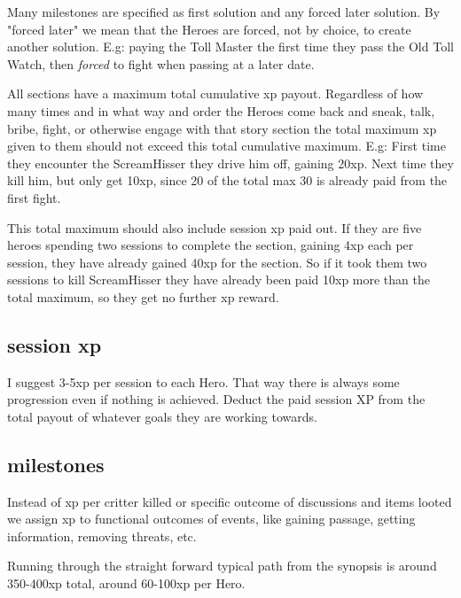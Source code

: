 Many milestones are specified as first solution and any forced later solution. By "forced later" we mean that the Heroes are forced, not by choice, to create another solution. E.g: paying the Toll Master the first time they pass the Old Toll Watch, then \emph{forced} to fight when passing at a later date.

All sections have a maximum total cumulative xp payout. Regardless of how many times and in what way and order the Heroes come back and sneak, talk, bribe, fight, or otherwise engage with that story section the total maximum xp given to them should not exceed this total cumulative maximum. E.g: First time they encounter the ScreamHisser they drive him off, gaining 20xp. Next time they kill him, but only get 10xp, since 20 of the total max 30 is already paid from the first fight.

This total maximum should also include session xp paid out. If they are five heroes spending two sessions to complete the section, gaining 4xp each per session, they have already gained 40xp for the section. So if it took them two sessions to kill ScreamHisser they have already been paid 10xp more than the total maximum, so they get no further xp reward.


\subsection*{session xp}
I suggest 3-5xp per session to each Hero. That way there is always some progression even if nothing is achieved. Deduct the paid session XP from the total payout of whatever goals they are working towards.


\subsection*{milestones}
Instead of xp per critter killed or specific outcome of discussions and items looted we assign xp to functional outcomes of events, like gaining passage, getting information, removing threats, etc.

Running through the straight forward typical path from the synopsis is around 350-400xp total, around 60-100xp per Hero.

